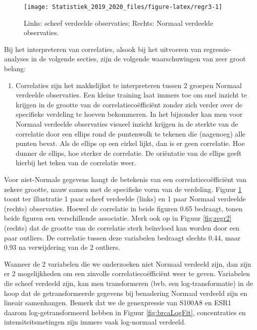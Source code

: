\documentclass[12pt,dutch,coursenotes]{book}
\providecommand{\tightlist}{%
  \setlength{\itemsep}{0pt}\setlength{\parskip}{0pt}}
\theoremstyle{definition}
\theoremstyle{definition}
\theoremstyle{definition}
\theoremstyle{remark}
\begin{document}
\begin{figure}

{\centering \texttt{[image: Statistiek\_2019\_2020\_files/figure-latex/regr3-1]} 

}

\caption{Links: scheef verdeelde observaties; Rechts: Normaal verdeelde observaties.}\label{fig:regr3}
\end{figure}

Bij het interpreteren van correlaties, alsook bij het uitvoeren van
regressie-analyses in de volgende secties, zijn de volgende
waarschuwingen van zeer groot belang:

\begin{enumerate}
\def\labelenumi{\arabic{enumi}.}
\tightlist
\item
  Correlaties zijn het makkelijkst te interpreteren tussen 2 groepen
  Normaal verdeelde observaties. Een kleine training laat immers toe om
  snel inzicht te krijgen in de grootte van de correlatiecoëfficiënt
  zonder zich verder over de specifieke verdeling te hoeven bekommeren.
  In het bijzonder kan men voor Normaal verdeelde observaties visueel
  inzicht krijgen in de sterkte van de correlatie door een ellips rond
  de puntenwolk te tekenen die (nagenoeg) alle punten bevat. Als de
  ellips op een cirkel lijkt, dan is er geen correlatie. Hoe dunner de
  ellips, hoe sterker de correlatie. De oriëntatie van de ellips geeft
  hierbij het teken van de correlatie weer.
\end{enumerate}

Voor niet-Normale gegevens hangt de betekenis van een
correlatiecoëfficiënt van zekere grootte, nauw samen met de specifieke
vorm van de verdeling. Figuur \ref{fig:regr3} toont ter illustratie 1
paar scheef verdeelde (links) en 1 paar Normaal verdeelde (rechts)
observaties. Hoewel de correlatie in beide figuren 0.65 bedraagt, tonen
beide figuren een verschillende associatie. Merk ook op in Figuur
\ref{fig:regr2} (rechts) dat de grootte van de correlatie sterk
beïnvloed kan worden door een paar outliers. De correlatie tussen deze
variabelen bedraagt slechts 0.44, maar 0.93 na verwijdering van de 2
outliers.

Wanneer de 2 variabelen die we onderzoeken niet Normaal verdeeld zijn,
dan zijn er 2 mogelijkheden om een zinvolle correlatiecoëfficiënt weer
te geven. Variabelen die scheef verdeeld zijn, kan men transformeren
(bvb. een log-transformatie) in de hoop dat de getransformeerde gegevens
bij benadering Normaal verdeeld zijn en lineair samenhangen. Bemerk dat
we de genexpressie van S100A8 en ESR1 daarom log-getransformeerd hebben
in Figuur \ref{fig:brcaLogFit}, concentraties en intensiteitsmetingen
zijn immers vaak log-normaal verdeeld.
\end{document}
